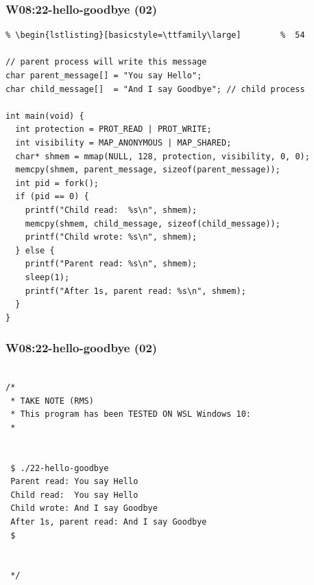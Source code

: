 \documentclass[xcolor=table, notheorems, hyperref={pdfpagelabels=false}]{beamer}
\begin{document}
\begin{frame}[fragile]
\frametitle{W08:22-hello-goodbye (02)}
\begin{lstlisting}[basicstyle=\ttfamily\footnotesize] %  72
% \begin{lstlisting}[basicstyle=\ttfamily\small]        %  65
% \begin{lstlisting}[basicstyle=\ttfamily\large]        %  54

// parent process will write this message
char parent_message[] = "You say Hello";  
char child_message[]  = "And I say Goodbye"; // child process 

int main(void) {
  int protection = PROT_READ | PROT_WRITE;
  int visibility = MAP_ANONYMOUS | MAP_SHARED;
  char* shmem = mmap(NULL, 128, protection, visibility, 0, 0);
  memcpy(shmem, parent_message, sizeof(parent_message));
  int pid = fork();
  if (pid == 0) {
    printf("Child read:  %s\n", shmem);
    memcpy(shmem, child_message, sizeof(child_message));
    printf("Child wrote: %s\n", shmem);
  } else {
    printf("Parent read: %s\n", shmem);
    sleep(1);
    printf("After 1s, parent read: %s\n", shmem);
  }
}

\end{lstlisting}
\end{frame}

\begin{frame}[fragile]
\frametitle{W08:22-hello-goodbye (02)}
\begin{lstlisting}[basicstyle=\ttfamily\large]        %  54

/*
 * TAKE NOTE (RMS)
 * This program has been TESTED ON WSL Windows 10:
 *


 $ ./22-hello-goodbye 
 Parent read: You say Hello
 Child read:  You say Hello
 Child wrote: And I say Goodbye
 After 1s, parent read: And I say Goodbye
 $


 */


\end{lstlisting}
\end{frame}
\end{document}
